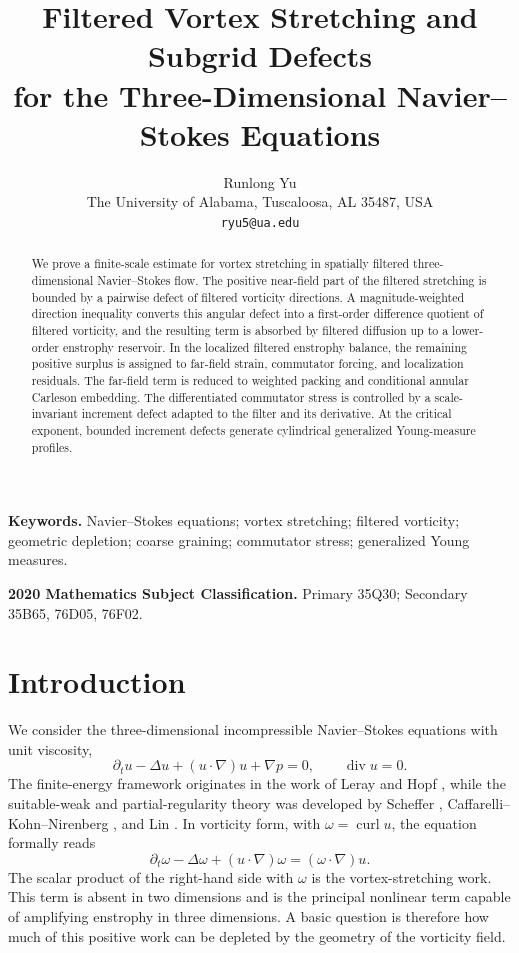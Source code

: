 \documentclass[11pt]{article}
\title{\textbf{Filtered Vortex Stretching and Subgrid Defects\\
		for the Three-Dimensional Navier--Stokes Equations}}
\author{Runlong Yu\\
	The University of Alabama, Tuscaloosa, AL 35487, USA\\
	\texttt{ryu5@ua.edu}}
\date{}
\numberwithin{equation}{section}
\theoremstyle{plain}
\theoremstyle{definition}
\theoremstyle{remark}
\DeclareMathOperator{\curl}{curl}
\DeclareMathOperator{\diver}{div}
\begin{document}
	
	\maketitle
	
	\begin{abstract}
		We prove a finite-scale estimate for vortex stretching in spatially filtered three-dimensional Navier--Stokes flow.  The positive near-field part of the filtered stretching is bounded by a pairwise defect of filtered vorticity directions.  A magnitude-weighted direction inequality converts this angular defect into a first-order difference quotient of filtered vorticity, and the resulting term is absorbed by filtered diffusion up to a lower-order enstrophy reservoir.  In the localized filtered enstrophy balance, the remaining positive surplus is assigned to far-field strain, commutator forcing, and localization residuals.  The far-field term is reduced to weighted packing and conditional annular Carleson embedding.  The differentiated commutator stress is controlled by a scale-invariant increment defect adapted to the filter and its derivative.  At the critical exponent, bounded increment defects generate cylindrical generalized Young-measure profiles.
	\end{abstract}
	
	\noindent\textbf{Keywords.}
	Navier--Stokes equations; vortex stretching; filtered vorticity; geometric depletion; coarse graining; commutator stress; generalized Young measures.
	
	\medskip
	
	\noindent\textbf{2020 Mathematics Subject Classification.}
	Primary 35Q30; Secondary 35B65, 76D05, 76F02.



\tableofcontents

\section{Introduction}

We consider the three-dimensional incompressible Navier--Stokes equations with unit viscosity,
\begin{equation}\label{eq:NS}
\partial_t u-\Delta u+(u\cdot\nabla)u+\nabla p=0,
\qquad
\diver u=0.
\end{equation}
The finite-energy framework originates in the work of Leray \cite{Leray1934} and Hopf \cite{Hopf1951}, while the suitable-weak and partial-regularity theory was developed by Scheffer \cite{Scheffer1976}, Caffarelli--Kohn--Nirenberg \cite{CKN1982}, and Lin \cite{Lin1998}.  In vorticity form, with $\omega=\curl u$, the equation formally reads
\begin{equation}\label{eq:vorticity-raw}
\partial_t\omega-\Delta\omega+(u\cdot\nabla)\omega
=(\omega\cdot\nabla)u.
\end{equation}
The scalar product of the right-hand side with $\omega$ is the vortex-stretching work.  This term is absent in two dimensions and is the principal nonlinear term capable of amplifying enstrophy in three dimensions.  A basic question is therefore how much of this positive work can be depleted by the geometry of the vorticity field.
\end{document}

